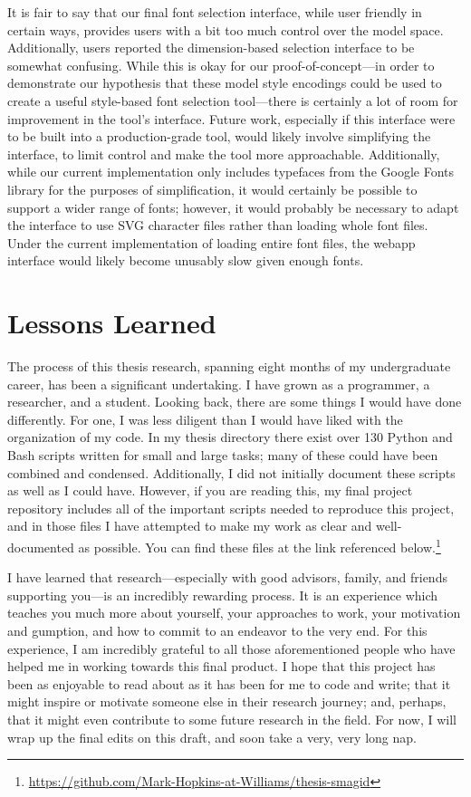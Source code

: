 It is fair to say that our final font selection interface, while user friendly in certain ways, provides users with a bit too much control over the model space. Additionally, users reported the dimension-based selection interface to be somewhat confusing. While this is okay for our proof-of-concept---in order to demonstrate our hypothesis that these model style encodings could be used to create a useful style-based font selection tool---there is certainly a lot of room for improvement in the tool's interface. Future work, especially if this interface were to be built into a production-grade tool, would likely involve simplifying the interface, to limit control and make the tool more approachable. Additionally, while our current implementation only includes typefaces from the Google Fonts library for the purposes of simplification, it would certainly be possible to support a wider range of fonts; however, it would probably be necessary to adapt the interface to use SVG character files rather than loading whole font files. Under the current implementation of loading entire font files, the webapp interface would likely become unusably slow given enough fonts.

\section{Lessons Learned}

The process of this thesis research, spanning eight months of my undergraduate career, has been a significant undertaking. I have grown as a programmer, a researcher, and a student. Looking back, there are some things I would have done differently. For one, I was less diligent than I would have liked with the organization of my code. In my thesis directory there exist over 130 Python and Bash scripts written for small and large tasks; many of these could have been combined and condensed. Additionally, I did not initially document these scripts as well as I could have. However, if you are reading this, my final project repository includes all of the important scripts needed to reproduce this project, and in those files I have attempted to make my work as clear and well-documented as possible. You can find these files at the link referenced below.\footnote{\url{https://github.com/Mark-Hopkins-at-Williams/thesis-smagid}}

I have learned that research---especially with good advisors, family, and friends supporting you---is an incredibly rewarding process. It is an experience which teaches you much more about yourself, your approaches to work, your motivation and gumption, and how to commit to an endeavor to the very end. For this experience, I am incredibly grateful to all those aforementioned people who have helped me in working towards this final product. I hope that this project has been as enjoyable to read about as it has been for me to code and write; that it might inspire or motivate someone else in their research journey; and, perhaps, that it might even contribute to some future research in the field. For now, I will wrap up the final edits on this draft, and soon take a very, very long nap.